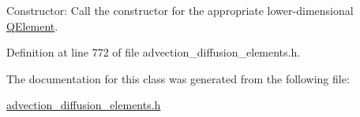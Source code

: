 Constructor\+: Call the constructor for the appropriate lower-\/dimensional \hyperlink{classoomph_1_1QElement}{Q\+Element}. 



Definition at line 772 of file advection\+\_\+diffusion\+\_\+elements.\+h.



The documentation for this class was generated from the following file\+:\begin{DoxyCompactItemize}
\item 
\hyperlink{advection__diffusion__elements_8h}{advection\+\_\+diffusion\+\_\+elements.\+h}\end{DoxyCompactItemize}
